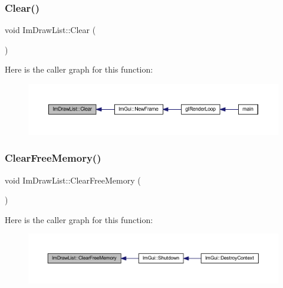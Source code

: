 \subsubsection{\texorpdfstring{Clear()}{Clear()}}
{\footnotesize\ttfamily void Im\+Draw\+List\+::\+Clear (\begin{DoxyParamCaption}{ }\end{DoxyParamCaption})}

Here is the caller graph for this function\+:
\nopagebreak
\begin{figure}[H]
\begin{center}
\leavevmode
\includegraphics[width=350pt]{struct_im_draw_list_ac422590c71dc5593aea52f65793aee81_icgraph}
\end{center}
\end{figure}
\mbox{\label{struct_im_draw_list_a8b2686e006f57c554b709dfc47e2ad63}} 
\subsubsection{\texorpdfstring{Clear\+Free\+Memory()}{ClearFreeMemory()}}
{\footnotesize\ttfamily void Im\+Draw\+List\+::\+Clear\+Free\+Memory (\begin{DoxyParamCaption}{ }\end{DoxyParamCaption})}

Here is the caller graph for this function\+:
\nopagebreak
\begin{figure}[H]
\begin{center}
\leavevmode
\includegraphics[width=350pt]{struct_im_draw_list_a8b2686e006f57c554b709dfc47e2ad63_icgraph}
\end{center}
\end{figure}
\mbox{\label{struct_im_draw_list_a24c853c3976c77e7b361fab39adde686}} 

